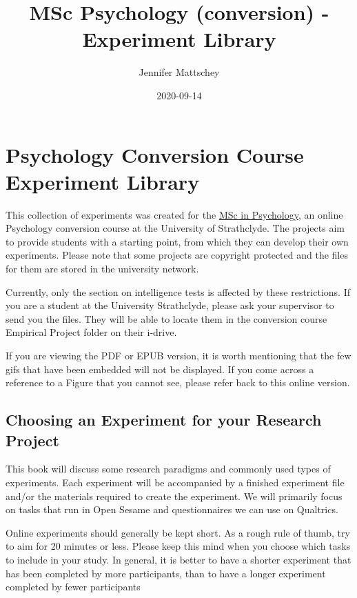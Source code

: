 \documentclass[
]{book}
\title{MSc Psychology (conversion) - Experiment Library}
\author{Jennifer Mattschey}
\date{2020-09-14}
\begin{document}
\maketitle

{
\setcounter{tocdepth}{1}
\tableofcontents
}
\hypertarget{psychology-conversion-course-experiment-library}{%
\chapter{Psychology Conversion Course Experiment Library}\label{psychology-conversion-course-experiment-library}}

This collection of experiments was created for the \href{https://www.strath.ac.uk/courses/postgraduatetaught/psychologywithaspecialisationinbusiness}{MSc in Psychology}, an online Psychology conversion course at the University of Strathclyde. The projects aim to provide students with a starting point, from which they can develop their own experiments. Please note that some projects are copyright protected and the files for them are stored in the university network.

Currently, only the section on intelligence tests is affected by these restrictions. If you are a student at the University Strathclyde, please ask your supervisor to send you the files. They will be able to locate them in the conversion course Empirical Project folder on their i-drive.

If you are viewing the PDF or EPUB version, it is worth mentioning that the few gifs that have been embedded will not be displayed. If you come across a reference to a Figure that you cannot see, please refer back to this online version.

\hypertarget{choosing-an-experiment-for-your-research-project}{%
\section{Choosing an Experiment for your Research Project}\label{choosing-an-experiment-for-your-research-project}}

This book will discuss some research paradigms and commonly used types of experiments. Each experiment will be accompanied by a finished experiment file and/or the materials required to create the experiment. We will primarily focus on tasks that run in Open Sesame and questionnaires we can use on Qualtrics.

Online experiments should generally be kept short. As a rough rule of thumb, try to aim for 20 minutes or less. Please keep this mind when you choose which tasks to include in your study. In general, it is better to have a shorter experiment that has been completed by more participants, than to have a longer experiment completed by fewer participants
\end{document}
